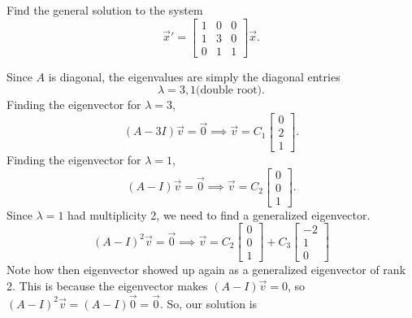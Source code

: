 \begin{example}
	Find the general solution to the system
	\begin{equation*}
		\vec{x}' = \begin{bmatrix}
			1 & 0 & 0 \\
			1 & 3 & 0 \\
			0 & 1 & 1
		\end{bmatrix} \vec{x}.
	\end{equation*}
\end{example}
\noindent
Since $A$ is diagonal, the eigenvalues are simply the diagonal entries
\begin{equation*}
	\lambda = 3, 1 \text{(double root)}.
\end{equation*}
Finding the eigenvector for $\lambda  = 3$,
\begin{equation*}
	(A - 3I)\vec{v} = \vec{0} \implies \vec{v} = C_1 \begin{bmatrix}
		0 \\
		2 \\
		1
	\end{bmatrix}.
\end{equation*}
Finding the eigenvector for $\lambda = 1$,
\begin{equation*}
	(A - I)\vec{v} = \vec{0} \implies \vec{v} = C_2 \begin{bmatrix}
		0 \\
		0 \\
		1
	\end{bmatrix}.
\end{equation*}
Since $\lambda  =1$ had multiplicity 2, we need to find a generalized eigenvector.
\begin{equation*}
	(A - I)^2\vec{v} = \vec{0} \implies \vec{v} = C_2 \begin{bmatrix}
		0 \\
		0 \\
		1
	\end{bmatrix} + C_3 \begin{bmatrix}
		-2 \\
		1 \\
		0
	\end{bmatrix}
\end{equation*}
Note how then eigenvector showed up again as a generalized eigenvector of rank 2.
This is because the eigenvector makes $(A - I)\vec{v} = 0$, so $(A - I)^2\vec{v} = (A - I)\vec{0} = \vec{0}$.
So, our solution is
